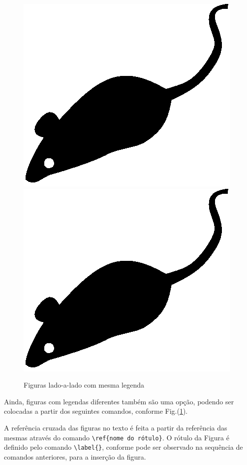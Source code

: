 \documentclass[12pt,A4,A4pt]{article}
\begin{document}
\begin{figure}[htbp]
\centering
\includegraphics[scale=0.8]{mouse}
\quad
\includegraphics[scale=0.5]{mouse}
\caption{\fontsize{10pt}{\baselineskip}\selectfont Figuras lado-a-lado com mesma legenda}
\label{fig:lado_a_lado}
\end{figure}


Ainda, figuras com legendas diferentes também são uma opção, podendo ser colocadas a partir dos seguintes comandos, conforme Fig.(\ref{fig:lado_a_lado}).

A referência cruzada das figuras no texto é feita a partir da referência das mesmas através do comando \verb|\ref{nome do rótulo}|. O rótulo da Figura é definido pelo comando \verb|\label{}|, conforme pode ser observado na sequência de comandos anteriores, para a inserção da figura.
\end{document}
